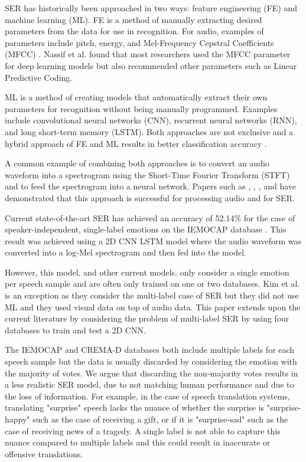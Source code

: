 \documentclass[a4paper, 10pt, conference]{ieeeconf}      %
\begin{document}
SER has historically been approached in two ways: feature engineering (FE) and machine learning (ML). FE is a method of manually extracting desired parameters from the data for use in recognition. For audio, examples of parameters include pitch, energy, and Mel-Frequency Cepstral Coefficients (MFCC) \cite{Rybka2013}. Nassif et al. \cite{Nassif2019} found that most researchers used the MFCC parameter for deep learning models but also recommended other parameters such as Linear Predictive Coding. 

ML is a method of creating models that automatically extract their own parameters for recognition without being manually programmed. Examples include convolutional neural networks (CNN), recurrent neural networks (RNN), and long short-term memory (LSTM). Both approaches are not exclusive and a hybrid approach of FE and ML results in better classification accuracy \cite{Nassif2019}.

A common example of combining both approaches is to convert an audio waveform into a spectrogram using the Short-Time Fourier Transform (STFT) and to feed the spectrogram into a neural network. Papers such as \cite{Engel2019}, \cite{Chen2018}, \cite{Badshah2019}, and \cite{Zhao2019} have demonstrated that this approach is successful for processing audio and for SER.

Current state-of-the-art SER has achieved an accuracy of 52.14\% for the case of speaker-independent, single-label emotions on the IEMOCAP database \cite{Zhao2019}. This result was achieved using a 2D CNN LSTM model where the audio waveform was converted into a log-Mel spectrogram and then fed into the model.

However, this model, and other current models, only consider a single emotion per speech sample and are often only trained on one or two databases. Kim et al. \cite{Kim2018a} is an exception as they consider the multi-label case of SER but they did not use ML and they used visual data on top of audio data. This paper extends upon the current literature by considering the problem of multi-label SER by using four databases to train and test a 2D CNN.

The IEMOCAP \cite{busso_2008} and CREMA-D \cite{cao_2014} databases both include multiple labels for each speech sample but the data is usually discarded by considering the emotion with the majority of votes. We argue that discarding the non-majority votes results in a less realistic SER model, due to not matching human performance and due to the loss of information. For example, in the case of speech translation systems, translating "surprise" speech lacks the nuance of whether the surprise is "surprise-happy" such as the case of receiving a gift, or if it is "surprise-sad" such as the case of receiving news of a tragedy. A single label is not able to capture this nuance compared to multiple labels and this could result in inaccurate or offensive translations.
\end{document}
